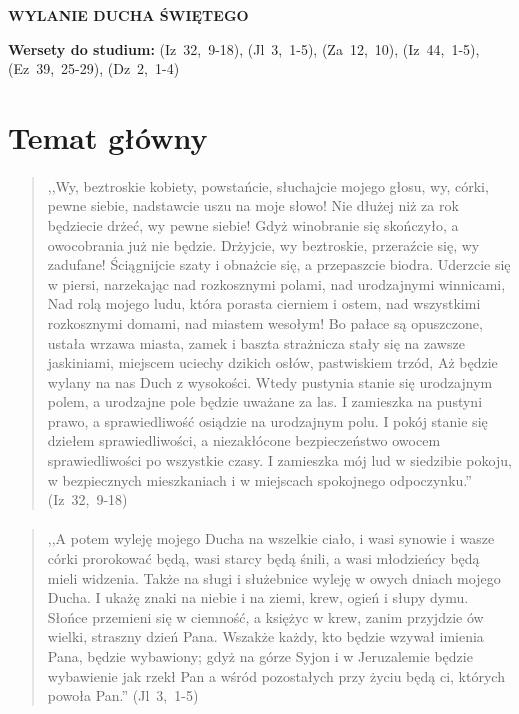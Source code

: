 \documentclass[10pt,a4paper,oneside]{article}
\begin{document}
\centerline{\textbf{\MakeUppercase{Wylanie Ducha Świętego}}}
\begin{center}
\textbf{Wersety do studium:} \mbox{(Iz 32, 9-18)}, \mbox{(Jl 3, 1-5)}, \mbox{(Za 12, 10)}, \mbox{(Iz 44, 1-5)}, \mbox{(Ez 39, 25-29)}, \mbox{(Dz 2, 1-4)}
\end{center}
\section{Temat główny}
\paragraph{}
\begin{quote}
,,Wy, beztroskie kobiety, powstańcie, słuchajcie mojego głosu, wy, córki, pewne siebie, nadstawcie uszu na moje słowo! Nie dłużej niż za rok będziecie drżeć, wy pewne siebie! Gdyż winobranie się skończyło, a owocobrania już nie będzie. Drżyjcie, wy beztroskie, przeraźcie się, wy zadufane! Ściągnijcie szaty i obnażcie się, a przepaszcie biodra. Uderzcie się w piersi, narzekając nad rozkosznymi polami, nad urodzajnymi winnicami, Nad rolą mojego ludu, która porasta cierniem i ostem, nad wszystkimi rozkosznymi domami, nad miastem wesołym! Bo pałace są opuszczone, ustała wrzawa miasta, zamek i baszta strażnicza stały się na zawsze jaskiniami, miejscem uciechy dzikich osłów, pastwiskiem trzód, Aż będzie wylany na nas Duch z wysokości. Wtedy pustynia stanie się urodzajnym polem, a urodzajne pole będzie uważane za las. I zamieszka na pustyni prawo, a sprawiedliwość osiądzie na urodzajnym polu. I pokój stanie się dziełem sprawiedliwości, a niezakłócone bezpieczeństwo owocem sprawiedliwości po wszystkie czasy. I zamieszka mój lud w siedzibie pokoju, w bezpiecznych mieszkaniach i w miejscach spokojnego odpoczynku.'' \mbox{(Iz 32, 9-18)}
\end{quote}
\paragraph{}
\begin{quote}
,,A potem wyleję mojego Ducha na wszelkie ciało, i wasi synowie i wasze córki prorokować będą, wasi starcy będą śnili, a wasi młodzieńcy będą mieli widzenia. Także na sługi i służebnice wyleję w owych dniach mojego Ducha. I ukażę znaki na niebie i na ziemi, krew, ogień i słupy dymu. Słońce przemieni się w ciemność, a księżyc w krew, zanim przyjdzie ów wielki, straszny dzień Pana. Wszakże każdy, kto będzie wzywał imienia Pana, będzie wybawiony; gdyż na górze Syjon i w Jeruzalemie będzie wybawienie jak rzekł Pan a wśród pozostałych przy życiu będą ci, których powoła Pan.'' \mbox{(Jl 3, 1-5)}
\end{quote}
\end{document}
